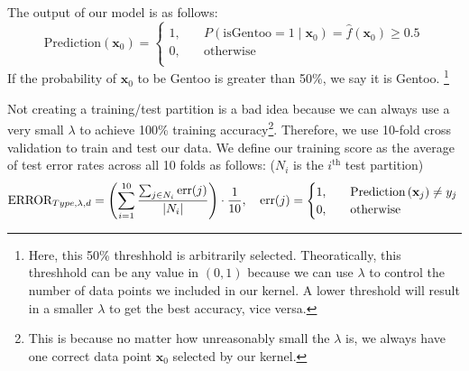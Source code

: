 \documentclass[12pt]{article}
\begin{document}
%

The output of our model is as follows:
\[
\text{Prediction}(\mathbf{x}_0)= 
\begin{cases}
1, &\quad P(\text{isGentoo}=1 \mid \mathbf{x}_0) = \hat{f}(\mathbf{x}_0) \ge 0.5\\
0, &\quad \text{otherwise}\\
\end{cases}
\]
If the probability of $\mathbf{x}_0$ to be Gentoo is greater than 50\%, we say it is Gentoo. \footnote{Here, this 50\% threshhold is arbitrarily selected. Theoratically, this threshhold can be any value in $\left( 0,1 \right) $ because we can use $\lambda$ to control the number of data points we included in our kernel. A lower threshold will result in a smaller $\lambda$ to get the best accuracy, vice versa.}

Not creating a training/test partition is a bad idea because we can always use a very small $\lambda$ to achieve 100\% training accuracy\footnote{This is because no matter how unreasonably small the $\lambda$ is, we always have one correct data point $\mathbf{x}_0$ selected by our kernel.}. Therefore, we use 10-fold cross validation to train and test our data. We define our training score as the average of test error rates across all 10 folds as follows: ($N_i$ is the $i^{\text{th}}$ test partition)
\[
\text{ERROR}_{Type,\lambda,d} = \left(\sum_{i=1}^{10}  \frac{\sum_{j\in N_i} \text{err}(j)}{|N_i|} \right) \cdot \frac{1}{10}, \quad \text{err}(j)=
\begin{cases}
1, &\quad \text{Prediction}\left(\mathbf{x}_j \right) \neq y_j\\
0, &\quad \text{otherwise}\\
\end{cases}\\
\] 
\end{document}
